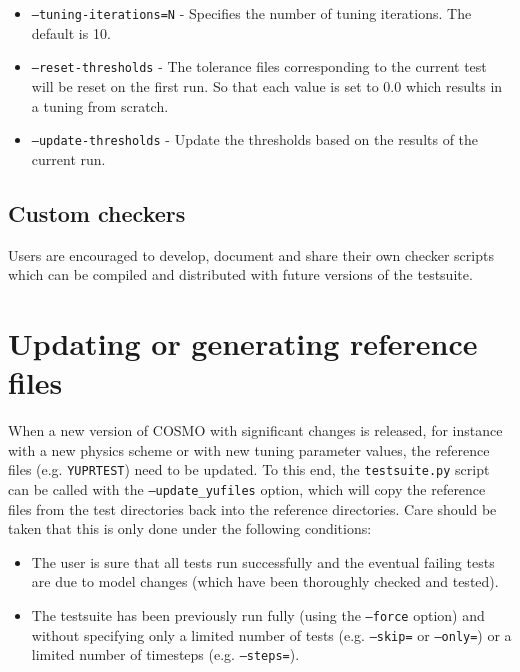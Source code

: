 \documentclass[12pt,twoside,a4paper]{report}
\begin{document}
\begin{itemize}
    \item \texttt{--tuning-iterations=N} - Specifies the number of tuning iterations. The default is 10.
	\item \texttt{--reset-thresholds} - The tolerance files corresponding to the current test will be reset on the first run. So that each value is set to 0.0 which results in a tuning from scratch.
	\item \texttt{--update-thresholds} - Update the thresholds based on the results of the current run.
\end{itemize}

\subsection{Custom checkers}

Users are encouraged to develop, document and share their own checker scripts which can be compiled and distributed with future versions of the testsuite.

\section{Updating or generating reference files}

When a new version of COSMO with significant changes is released, for instance with a new physics scheme or with new tuning parameter values, the reference files (e.g. \texttt{YUPRTEST}) need to be updated. To this end, the \texttt{testsuite.py} script can be called with the \texttt{--update\_yufiles} option, which will copy the reference files from the test directories back into the reference directories. Care should be taken that this is only done under the following conditions:
\begin{itemize}
    \item The user is sure that all tests run successfully and the eventual failing tests are due to model changes (which have been thoroughly checked and tested).
    \item The testsuite has been previously run fully (using the \texttt{--force} option) and without specifying only a limited number of tests (e.g. \texttt{--skip=} or \texttt{--only=}) or a limited number of timesteps (e.g. \texttt{--steps=}).
\end{itemize}
\end{document}
